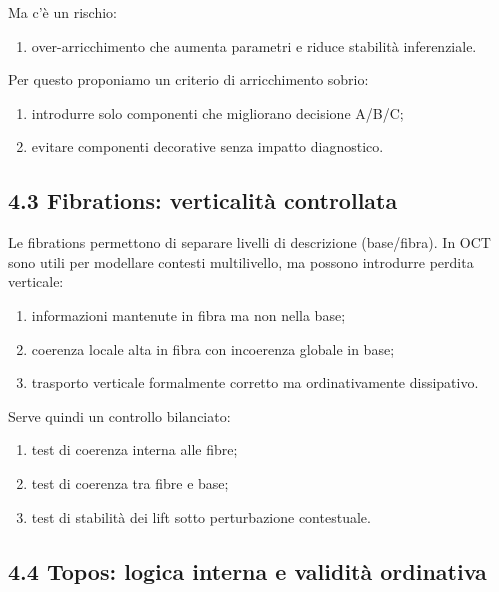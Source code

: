 Ma c'è un rischio:

\begin{enumerate}
\def\labelenumi{\arabic{enumi}.}
\tightlist
\item
  over-arricchimento che aumenta parametri e riduce stabilità inferenziale.
\end{enumerate}

Per questo proponiamo un criterio di arricchimento sobrio:

\begin{enumerate}
\def\labelenumi{\arabic{enumi}.}
\tightlist
\item
  introdurre solo componenti che migliorano decisione A/B/C;
\item
  evitare componenti decorative senza impatto diagnostico.
\end{enumerate}

\subsection{4.3 Fibrations: verticalità controllata}

Le fibrations permettono di separare livelli di descrizione (base/fibra). In OCT sono utili per modellare contesti multilivello, ma possono introdurre perdita verticale:

\begin{enumerate}
\def\labelenumi{\arabic{enumi}.}
\tightlist
\item
  informazioni mantenute in fibra ma non nella base;
\item
  coerenza locale alta in fibra con incoerenza globale in base;
\item
  trasporto verticale formalmente corretto ma ordinativamente dissipativo.
\end{enumerate}

Serve quindi un controllo bilanciato:

\begin{enumerate}
\def\labelenumi{\arabic{enumi}.}
\tightlist
\item
  test di coerenza interna alle fibre;
\item
  test di coerenza tra fibre e base;
\item
  test di stabilità dei lift sotto perturbazione contestuale.
\end{enumerate}

\subsection{4.4 Topos: logica interna e validità ordinativa}

